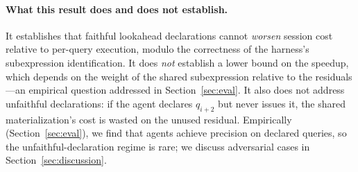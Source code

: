 \paragraph{What this result does and does not establish.}
It establishes that faithful lookahead declarations cannot \emph{worsen} session cost relative to per-query execution, modulo the correctness of the harness's subexpression identification. It does \emph{not} establish a lower bound on the speedup, which depends on the weight of the shared subexpression relative to the residuals---an empirical question addressed in Section~\ref{sec:eval}. It also does not address unfaithful declarations: if the agent declares $q_{i+2}$ but never issues it, the shared materialization's cost is wasted on the unused residual. Empirically (Section~\ref{sec:eval}), we find that agents achieve \mTwoPrecision precision on declared queries, so the unfaithful-declaration regime is rare; we discuss adversarial cases in Section~\ref{sec:discussion}.
